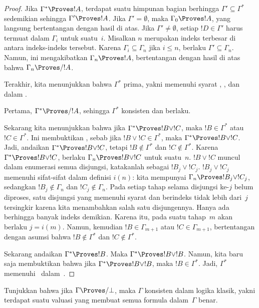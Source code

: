 \documentclass[../../../include/open-logic-section]{subfiles}
\begin{document}
\begin{proof}
  Jika $\Gamma^*\Proves !A$, terdapat suatu himpunan bagian berhingga
  $\Gamma'\subseteq\Gamma^*$ sedemikian sehingga $\Gamma'\Proves !A$.
  Jika $\Gamma'=\emptyset$, maka $\Gamma_0\Proves !A$, yang langsung
  bertentangan dengan hasil di atas. Jika $\Gamma'\ne\emptyset$, setiap
  $!D\in\Gamma'$ harus termuat dalam $\Gamma_i$ untuk suatu~$i$. Misalkan
  $n$ merupakan indeks terbesar di antara indeks-indeks tersebut. Karena
  $\Gamma_i\subseteq\Gamma_n$ jika $i\le n$, berlaku
  $\Gamma'\subseteq\Gamma_n$. Namun, ini mengakibatkan
  $\Gamma_n\Proves !A$, bertentangan dengan hasil di atas bahwa
  $\Gamma_n\Proves/ !A$.

  Terakhir, kita menunjukkan bahwa $\Gamma^*$ prima, yakni memenuhi syarat
  , , dan~ dalam
  .

  Pertama, $\Gamma^*\Proves/ !A$, sehingga $\Gamma^*$ konsisten dan
   berlaku.

  Sekarang kita menunjukkan bahwa jika $\Gamma^*\Proves !B\lor !C$, maka
  $!B\in\Gamma^*$ atau $!C\in\Gamma^*$. Ini membuktikan
  , sebab jika $!B\lor !C\in\Gamma^*$, maka
  $\Gamma^*\Proves !B\lor !C$. Jadi, andaikan
  $\Gamma^*\Proves !B\lor !C$, tetapi $!B\notin\Gamma^*$ dan
  $!C\notin\Gamma^*$. Karena $\Gamma^*\Proves !B\lor !C$, berlaku
  $\Gamma_n\Proves !B\lor !C$ untuk suatu~$n$. $!B\lor !C$ muncul dalam
  enumerasi semua disjungsi, katakanlah sebagai $!B_j\lor !C_j$.
  $!B_j\lor !C_j$ memenuhi sifat-sifat dalam definisi $i(n)$: kita
  mempunyai $\Gamma_n\Proves !B_j\lor !C_j$, sedangkan
  $!B_j\notin\Gamma_n$ dan $!C_j\notin\Gamma_n$. Pada setiap tahap selama
  disjungsi ke-$j$ belum diproses, satu disjungsi yang memenuhi syarat dan
  berindeks tidak lebih dari~$j$ tersingkir karena kita menambahkan salah satu
  disjungennya. Hanya ada berhingga banyak indeks demikian. Karena itu, pada
  suatu tahap~$m$ akan berlaku $j=i(m)$. Namun, kemudian
  $!B\in\Gamma_{m+1}$ atau
  $!C\in\Gamma_{m+1}$, bertentangan dengan asumsi bahwa
  $!B\notin\Gamma^*$ dan $!C\notin\Gamma^*$.

  Sekarang andaikan $\Gamma^*\Proves !B$. Maka
  $\Gamma^*\Proves !B\lor !B$. Namun, kita baru saja membuktikan bahwa jika
  $\Gamma^*\Proves !B\lor !B$, maka $!B\in\Gamma^*$. Jadi, $\Gamma^*$
  memenuhi~ dalam~.
\end{proof}

\begin{prob}
Tunjukkan bahwa jika $\Gamma \Proves/ \bot$, maka $\Gamma$ konsisten dalam
logika klasik, yakni terdapat suatu valuasi yang membuat semua formula
dalam~$\Gamma$ benar.
\end{prob}
\end{document}

